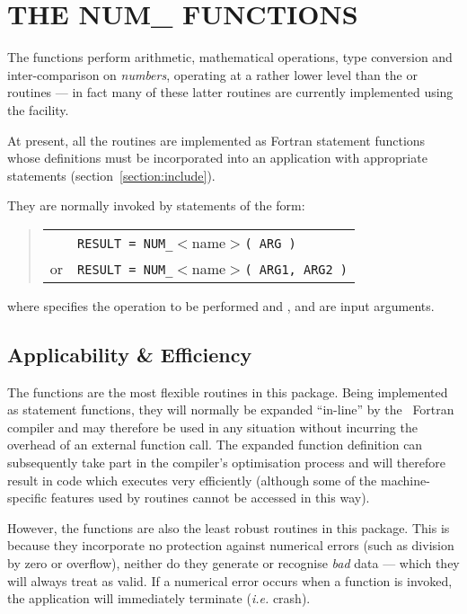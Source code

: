 \section{THE NUM\_ FUNCTIONS}

\label{section:num}

The  functions perform arithmetic, mathematical operations, type
conversion and inter-comparison on {\em numbers}, operating at a rather
lower level than the  or  routines --- in fact many
of these latter routines are currently implemented using the 
facility. 

At present, all the  routines are implemented as Fortran
statement functions whose definitions must be incorporated into an
application with appropriate  statements
(section~\ref{section:include}). 

They are normally invoked by statements of the form:

\begin{quote}
\begin{tabular}{rl}
& \verb#RESULT = NUM_#$<$name$>$\verb#( ARG )#\\
or & \verb#RESULT = NUM_#$<$name$>$\verb#( ARG1, ARG2 )#
\end{tabular}
\end{quote}

where  specifies the operation to be performed and
,  and  are input arguments.

\subsection{Applicability \& Efficiency}

The  functions are the most flexible routines in this package. 
Being implemented as statement functions, they will normally be expanded
``in-line'' by the ~Fortran compiler and may therefore be used in
any situation without incurring the overhead of an external function call. 
The expanded function definition can subsequently take part in the 
compiler's optimisation process and will therefore result in code which
executes very efficiently (although some of the machine-specific features
used by  routines cannot be accessed in this way). 

However, the  functions are also the least robust routines in
this package. 
This is because they incorporate no protection against numerical errors
(such as division by zero or overflow), neither do they generate or
recognise {\em bad} data --- which they will always treat as valid. 
If a numerical error occurs when a  function is invoked, the
application will immediately terminate ({\em i.e.} crash).

